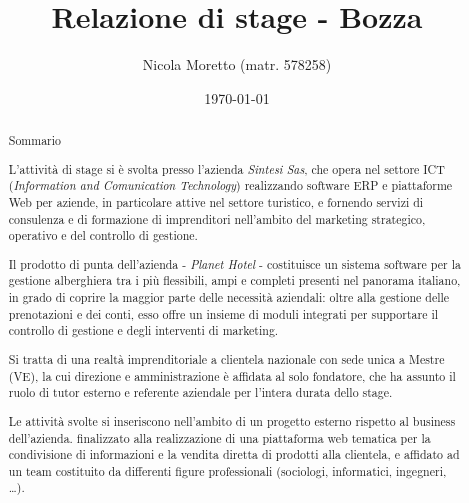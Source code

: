 \documentclass[11pt,a4paper,headsepline,hidelinks]{scrreprt} %
\begin{document}
  \title{Relazione di stage - Bozza}
	\subject{Analisi e progettazione di un'interfaccia grafica per la consultazione dei contenuti informativi in una piattaforma web tematica}
  \author{Nicola Moretto (matr. 578258)}
  \date{\today}

  \maketitle

	\tableofcontents

	\listoffigures
	\begingroup
	\let\clearpage\relax
	\listoftables
	\endgroup
	
	\begin{abstract}
	\chapter*{Sommario}
	L'attività di stage si è svolta presso l'azienda \textit{Sintesi Sas}, che opera nel settore ICT (\textit{Information and Comunication Technology}) realizzando software ERP e piattaforme Web per aziende, in particolare attive nel settore turistico, e fornendo servizi di consulenza e di formazione di imprenditori nell'ambito del marketing strategico, operativo e del controllo di gestione.
	
	Il prodotto di punta dell'azienda - \textit{Planet Hotel} - costituisce un sistema software per la gestione alberghiera tra i più flessibili, ampi e completi presenti nel panorama italiano, in grado di coprire la maggior parte delle necessità aziendali: oltre alla gestione delle prenotazioni e dei conti, esso offre un insieme di moduli integrati per supportare il controllo di gestione e degli interventi di marketing.

	Si tratta di una realtà imprenditoriale a clientela nazionale con sede unica a Mestre (VE), la cui direzione e amministrazione è affidata al solo fondatore, che ha assunto il ruolo di tutor esterno e referente aziendale per l'intera durata dello stage.

	Le attività svolte si inseriscono nell'ambito di un progetto esterno rispetto al business dell'azienda. finalizzato alla realizzazione di una piattaforma web tematica per la condivisione di informazioni e la vendita diretta di prodotti alla clientela, e affidato ad un team costituito da differenti figure professionali (sociologi, informatici, ingegneri, \ldots).
	

\end{abstract}
\end{document}
